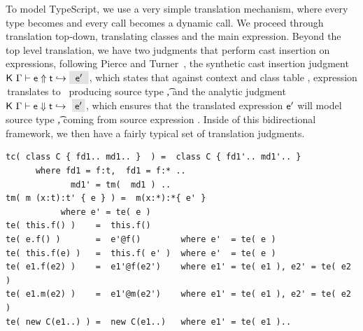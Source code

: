 \documentclass[acmlarge, anonymous, authordraft]{acmart}
\begin{document}
To model TypeScript, we use a very simple translation mechanism, where every
type becomes \any and every call becomes a dynamic call.  We proceed through
translation top-down, translating classes and the main expression.  Beyond
the top level translation, we have two judgments that perform cast insertion
on expressions, following Pierce and Turner~\cite{pierce:1998:local}, the
synthetic cast insertion judgment $\GenCast\K\Env\e\ep\t$, which states that
against context \Env and class table \src\K, expression \src\e\,translates to
\ep\, producing source type \src\t, and the analytic judgment
$\AnaCast\K\Env\e\ep\t$, which ensures that the translated expression ${{{\sf{e'}}}}$
will model source type \src\t, coming from source expression \src\e.  Inside
of this bidirectional framework, we then have a fairly typical set of
translation judgments.


\newpage
\begin{verbatim}
tc( class C { fd1.. md1.. }  ) =  class C { fd1'.. md1'.. } 
      where fd1 = f:t,  fd1 = f:* .. 
             md1' = tm(  md1 ) ..
tm( m (x:t):t' { e } ) =  m(x:*):*{ e' }
           where e' = te( e )
te( this.f() )    =  this.f() 
te( e.f() )       =  e'@f()        where e'  = te( e )
te( this.f(e) )   =  this.f( e' )  where e'  = te( e )
te( e1.f(e2) )    =  e1'@f(e2')    where e1' = te( e1 ), e2' = te( e2 )
te( e1.m(e2) )    =  e1'@m(e2')    where e1' = te( e1 ), e2' = te( e2 )
te( new C(e1..) ) =  new C(e1..)   where e1' = te( e1 ).. 
\end{verbatim}
\end{document}
